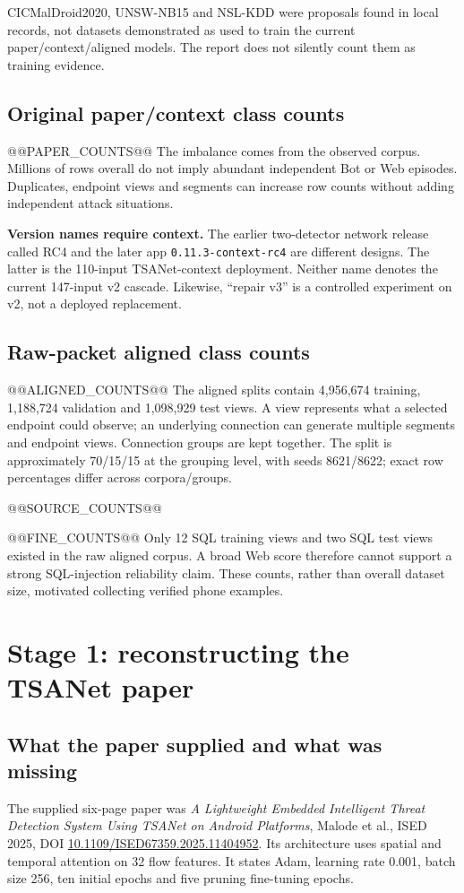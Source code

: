 \documentclass[11pt,a4paper,oneside]{report}
\newcommand{\code}[1]{\nolinkurl{#1}}
\begin{document}
CICMalDroid2020, UNSW-NB15 and NSL-KDD were proposals found in local records, not datasets demonstrated as used to train the current paper/context/aligned models. The report does not silently count them as training evidence.

\section{Original paper/context class counts}
@@PAPER_COUNTS@@
The imbalance comes from the observed corpus. Millions of rows overall do not imply abundant independent Bot or Web episodes. Duplicates, endpoint views and segments can increase row counts without adding independent attack situations.

\textbf{Version names require context.} The earlier two-detector network release called RC4 and the later app \code{0.11.3-context-rc4} are different designs. The latter is the 110-input TSANet-context deployment. Neither name denotes the current 147-input v2 cascade. Likewise, ``repair v3'' is a controlled experiment on v2, not a deployed replacement.

\section{Raw-packet aligned class counts}
@@ALIGNED_COUNTS@@
The aligned splits contain 4,956,674 training, 1,188,724 validation and 1,098,929 test views. A view represents what a selected endpoint could observe; an underlying connection can generate multiple segments and endpoint views. Connection groups are kept together. The split is approximately 70/15/15 at the grouping level, with seeds 8621/8622; exact row percentages differ across corpora/groups.

@@SOURCE_COUNTS@@

@@FINE_COUNTS@@
Only 12 SQL training views and two SQL test views existed in the raw aligned corpus. A broad Web score therefore cannot support a strong SQL-injection reliability claim. These counts, rather than overall dataset size, motivated collecting verified phone examples.

\chapter{Stage 1: reconstructing the TSANet paper}
\section{What the paper supplied and what was missing}
The supplied six-page paper was \emph{A Lightweight Embedded Intelligent Threat Detection System Using TSANet on Android Platforms}, Malode et al., ISED 2025, DOI \href{https://doi.org/10.1109/ISED67359.2025.11404952}{10.1109/ISED67359.2025.11404952}. Its architecture uses spatial and temporal attention on 32 flow features. It states Adam, learning rate 0.001, batch size 256, ten initial epochs and five pruning fine-tuning epochs.
\end{document}
